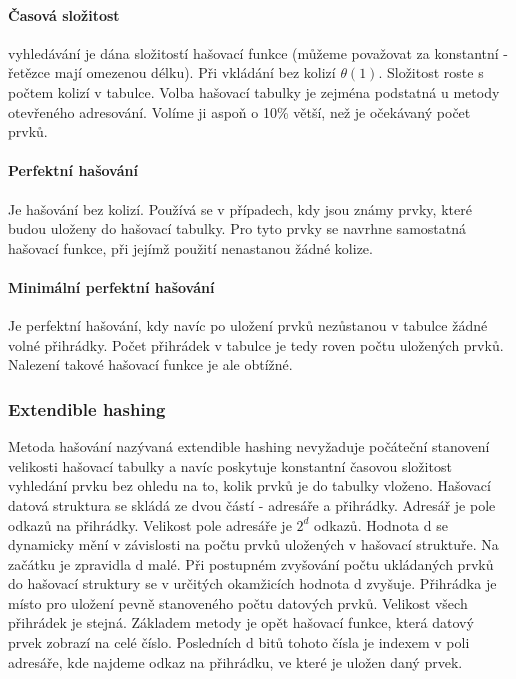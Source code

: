 \documentclass[10pt,a4paper]{article}
\begin{document}
\paragraph{Časová složitost} vyhledávání je dána složitostí hašovací funkce (můžeme považovat za konstantní - řetězce mají omezenou délku). Při vkládání bez kolizí $\theta (1)$. Složitost roste s počtem kolizí v tabulce. Volba hašovací tabulky je zejména podstatná u metody otevřeného adresování. Volíme ji aspoň o 10\% větší, než je očekávaný počet prvků.
\paragraph{Perfektní hašování} Je hašování bez kolizí. Používá se v případech, kdy jsou známy prvky, které budou uloženy do hašovací tabulky. Pro tyto prvky se navrhne samostatná hašovací funkce, při jejímž použití nenastanou žádné kolize.
\paragraph{Minimální perfektní hašování} Je perfektní hašování, kdy navíc po uložení prvků nezůstanou v tabulce žádné volné přihrádky. Počet přihrádek v tabulce je tedy roven počtu uložených prvků. Nalezení takové hašovací funkce je ale obtížné.
\subsubsection{Extendible hashing}
Metoda hašování nazývaná extendible hashing nevyžaduje počáteční stanovení velikosti hašovací tabulky a navíc poskytuje konstantní časovou složitost vyhledání prvku bez ohledu na to, kolik prvků je do tabulky vloženo. Hašovací datová struktura se skládá ze dvou částí - adresáře a přihrádky. Adresář je pole odkazů na přihrádky. Velikost pole adresáře je $2^d$ odkazů. Hodnota d se dynamicky mění v závislosti na počtu prvků uložených v hašovací struktuře. Na začátku je zpravidla d malé. Při postupném zvyšování počtu ukládaných prvků do hašovací struktury se v určitých okamžicích hodnota d zvyšuje. Přihrádka je místo pro uložení pevně stanoveného počtu datových prvků. Velikost všech přihrádek je stejná. Základem metody je opět hašovací funkce, která datový prvek zobrazí na celé číslo. Posledních d bitů tohoto čísla je indexem v poli adresáře, kde najdeme odkaz na přihrádku, ve které je uložen daný prvek.
\end{document}
